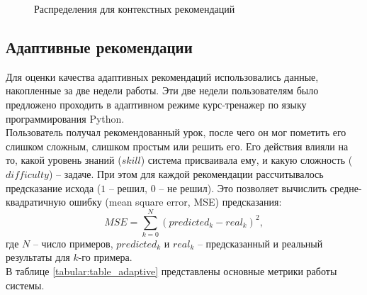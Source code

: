 \documentclass[14pt]{matmex-diploma}
\begin{document}
\begin{figure}[h]
  \centering
  \hfill
    \caption{Распределения для контекстных рекомендаций}
    \label{fig:context_distibutions}
\end{figure}

\subsection{Адаптивные рекомендации}
\indent Для оценки качества адаптивных рекомендаций использовались данные, накопленные за две недели работы. Эти две недели пользователям было предложено проходить в адаптивном режиме курс-тренажер по языку программирования Python. 
\\\indent Пользователь получал рекомендованный урок, после чего он мог пометить его слишком сложным, слишком простым или решить его. Его действия влияли на то, какой уровень знаний ($skill$) система присваивала ему, и какую сложность ($\mathit{difficulty}$) -- задаче. При этом для каждой рекомендации рассчитывалось предсказание исхода ($1$ -- решил, $0$ -- не решил). Это позволяет вычислить средне-квадратичную ошибку (mean square error, MSE) предсказания: $$MSE = \sum_{k=0}^{N}(predicted_k - real_k)^2,$$ где $N$ -- число примеров, $predicted_k$ и $real_k$ -- предсказанный и реальный результаты для $k$-го примера.
\\\indent В таблице \ref{tabular:table_adaptive} представлены основные метрики работы системы.
\end{document}
